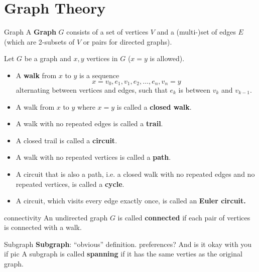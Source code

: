 \documentclass[english]{lbscript}
\begin{document}
\section{Graph Theory}
\label{sec:graph-theory}

\begin{definition}{Graph}{}
	A \textbf{Graph} \(G\) consists of a set of vertices \(V\) and a (multi-)set of edges \(E\) (which are 2-subsets of \(V\) or pairs for directed graphs).
\end{definition}

\begin{definition}{}{}
	Let \(G\) be a graph and \(x, y\) vertices in \(G\) (\(x=y\) is allowed).
	\begin{itemize}
		\item A \textbf{walk} from \(x\) to \(y\) is a sequence
		      \begin{equation}
			      \label{eq:94}
			      x= v_0,e_1,v_1,e_2,\dots, e_n, v_n=y
		      \end{equation}
		      alternating between vertices and edges, such that \(e_k\) is between \(v_k\) and \(v_{k-1}\).
		\item A walk from \(x\) to \(y\) where \(x=y\) is called a \textbf{closed walk}.
		\item A walk with no repeated edges is called a \textbf{trail}.
		\item A closed trail is called a \textbf{circuit}.
		\item A walk with no repeated vertices is called a \textbf{path}.
		\item A circuit that is also a path, i.e. a closed walk with no repeated edges and no repeated vertices, is called a \textbf{cycle}.
		\item A circuit, which visits every edge exactly once, is called an \textbf{Euler circuit.} %
	\end{itemize}
\end{definition}

\begin{definition}{connectivity}{}
	An undirected graph \(G\) is called \textbf{connected} if each pair of vertices is connected with a walk.
\end{definition}

\begin{definition}{Subgraph}{}
	\textbf{Subgraph}: \enquote{obvious} definition.
	preferences? And is it okay with you if pic
	A subgraph is called \textbf{spanning} if it has the same verties as the original graph.
\end{definition}
\end{document}
